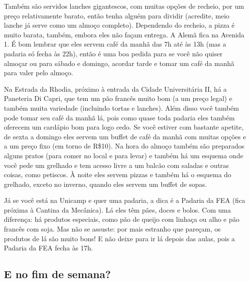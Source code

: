 Também são servidos lanches gigantescos, com muitas opções de recheio, por um
preço relativamente barato, então tenha alguém para dividir (acredite, meio
lanche já serve como um almoço completo). Dependendo do recheio, a pizza é muito
barata, também, embora eles não façam entrega. A Alemã fica na Avenida 1. É bom lembrar que eles servem café da manhã das 7h até às 13h
(mas a padaria só fecha às 22h), então é uma boa pedida para se você não quiser
almoçar ou para sábado e domingo, acordar tarde e tomar um café da manhã para
valer pelo almoço.

Na Estrada da Rhodia, próximo à entrada da Cidade Universitária II, há
a Paneteria Di Capri, que tem um pão francês muito bom (a um preço legal)
e também muita variedade (incluindo tortas e lanches). Além disso você também
pode tomar seu café da manhã lá, pois como quase toda padaria eles também
oferecem um cardápio bom para logo cedo. Se você estiver com bastante apetite,
de sexta a domingo eles servem um buffet de café da manhã com muitas opções
e a um preço fixo (em torno de R\$10). Na hora do almoço também são preparados
alguns pratos (para comer no local e para levar) e também há um esquema onde
você pede um grelhado e tem acesso livre a um balcão com saladas e outras
coisas, como petiscos. À noite eles servem pizzas e também há o esquema do
grelhado, exceto no inverno, quando eles servem um buffet de sopas.

Já se você está na Unicamp e quer uma padaria, a dica é a Padaria da FEA (fica
próxima à Cantina da Mecânica). Lá eles têm pães, doces e bolos. Com uma
diferença: há produtos especiais, como pão de queijo com linhaça ou alho e pão
francês com soja. Mas não se assuste: por mais estranho que pareçam, os produtos
de lá são muito bons! E não deixe para ir lá depois das aulas, pois a Padaria da
FEA fecha às 17h.

\subsection{E no fim de semana?}

